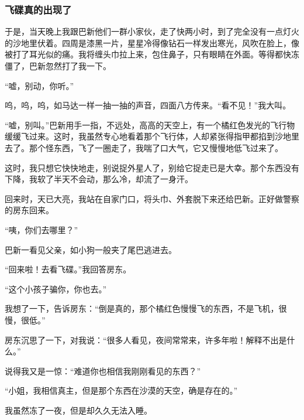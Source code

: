 \subsubsection*{飞碟真的出现了}
\par 于是，当天晚上我跟巴新他们一群小家伙，走了快两小时，到了完全没有一点灯火的沙地里伏着。四周是漆黑一片，星星冷得像钻石一样发出寒光，风吹在脸上，像被打了耳光似的痛。我将缠头巾拉上来，包住鼻子，只有眼睛在外面。等得都快冻僵了，巴新忽然打了我一下。
\par “嘘，别动，你听。”
\par 呜，呜，呜，如马达一样一抽一抽的声音，四面八方传来。“看不见！”我大叫。
\par “嘘，别叫。”巴新用手一指，不远处，高高的天空上，有一个橘红色发光的飞行物缓缓飞过来。这时，我虽然专心地看着那个飞行体，人却紧张得指甲都掐到沙地里去了。那个怪东西，飞了一圈走了，我喘了口大气，它又慢慢地低飞过来了。
\par 这时，我只想它快快地走，别说捉外星人了，别给它捉走已是大幸。那个东西没有下降，我软了半天不会动，那么冷，却流了一身汗。
\par 回来时，天已大亮，我站在自家门口，将头巾、外套脱下来还给巴新。正好做警察的房东回来。
\par “咦，你们去哪里？”
\par 巴新一看见父亲，如小狗一般夹了尾巴逃进去。
\par “回来啦！去看飞碟。”我回答房东。
\par “这个小孩子骗你，你也去。”
\par 我想了一下，告诉房东：“倒是真的，那个橘红色慢慢飞的东西，不是飞机，很慢，很低。”
\par 房东沉思了一下，对我说：“很多人看见，夜间常常来，许多年啦！解释不出是什么。”
\par 说得我又是一惊：“难道你也相信我刚刚看见的东西？”
\par “小姐，我相信真主，但是那个东西在沙漠的天空，确是存在的。”
\par 我虽然冻了一夜，但是却久久无法入睡。
